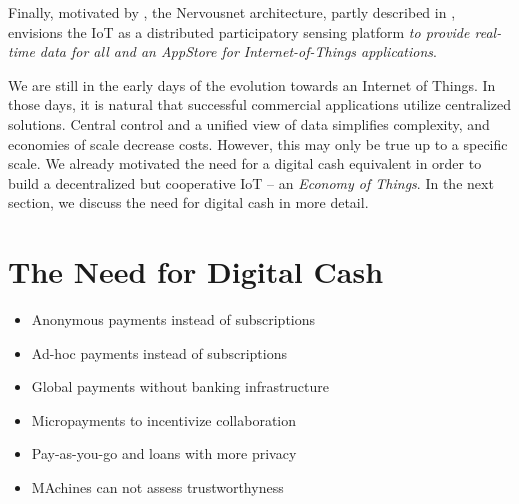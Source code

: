 Finally, motivated by \cite{Giannotti2012}, the Nervousnet architecture, partly described in \parencite{7097988}, envisions the IoT as a distributed participatory sensing platform \emph{to provide real-time data for all and an AppStore for Internet-of-Things applications}.

We are still in the early days of the evolution towards an Internet of Things. In those days, it is natural that successful commercial applications utilize centralized solutions. Central control and a unified view of data simplifies complexity, and economies of scale decrease costs. However, this may only be true up to a specific scale. We already motivated the need for a digital cash equivalent in order to build a decentralized but cooperative IoT -- an \emph{Economy of Things}. In the next section, we discuss the need for digital cash in more detail.



\section{The Need for Digital Cash}

\begin{itemize}
\item Anonymous payments instead of subscriptions
\item Ad-hoc payments instead of subscriptions
\item Global payments without banking infrastructure
\item Micropayments to incentivize collaboration
\item Pay-as-you-go and loans with more privacy
\item MAchines can not assess trustworthyness

\end{itemize}


  




